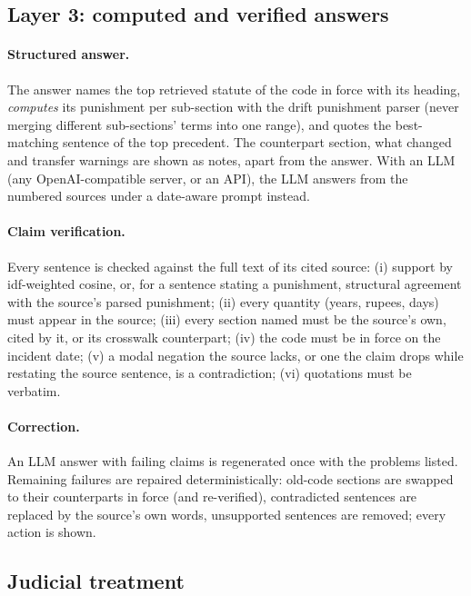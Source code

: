 \documentclass[sigconf,nonacm]{acmart}
\begin{document}
\subsection{Layer 3: computed and verified answers}

\paragraph{Structured answer.} The answer names the top retrieved statute of the code in force with
its heading, \emph{computes} its punishment per sub-section with the drift punishment parser
(never merging different sub-sections' terms into one range), and quotes the best-matching sentence
of the top precedent. The counterpart section, what changed and transfer warnings are shown as
notes, apart from the answer. With an LLM (any OpenAI-compatible server, or an API), the LLM
answers from the numbered sources under a date-aware prompt instead.
\paragraph{Claim verification.} Every sentence is checked against the full text of its cited source:
(i) support by idf-weighted cosine, or, for a sentence stating a punishment, structural agreement
with the source's parsed punishment; (ii) every quantity (years, rupees, days) must appear in the
source; (iii) every section named must be the source's own, cited by it, or its crosswalk
counterpart; (iv) the code must be in force on the incident date; (v) a modal negation the source
lacks, or one the claim drops while restating the source sentence, is a contradiction; (vi)
quotations must be verbatim.
\paragraph{Correction.} An LLM answer with failing claims is regenerated once with the problems
listed. Remaining failures are repaired deterministically: old-code sections are swapped to their
counterparts in force (and re-verified), contradicted sentences are replaced by the source's own
words, unsupported sentences are removed; every action is shown.

\subsection{Judicial treatment}\label{sec:treatment}
\end{document}
